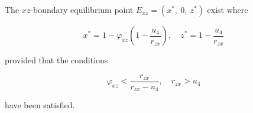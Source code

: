 \begin{theorem}\label{thm:eq-boundary-xz-exist}
    The $xz$-boundary equilibrium point $E_{xz}=\left(x^*,\ 0,\ z^*\right)$ exist where 
    
    \begin{equation*}
        x^*=1-\varphi_{xz}\left(1-\frac{u_4}{r_{zx}}\right),\quad z^*=1-\frac{u_4}{r_{zx}}
    \end{equation*}
    
    provided that the conditions
    
    \begin{equation*}
        \varphi_{xz}<\frac{r_{zx}}{r_{zx}-u_4},\quad r_{zx}>u_4
    \end{equation*}
    
    have been satisfied.
\end{theorem}
